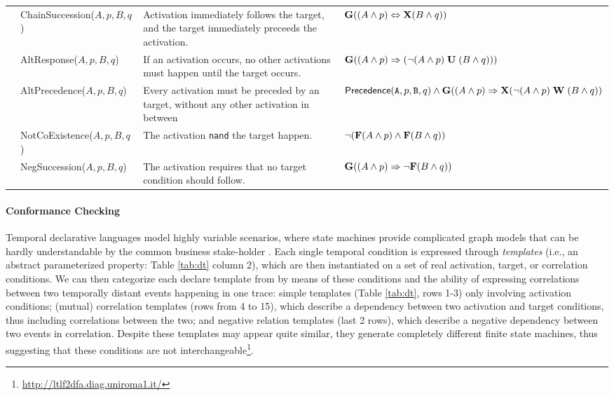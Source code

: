 \begin{table}
{\begin{tabular}{c|l|p{9cm}|l}
	 & \textsf{ChainSuccession($A,p,B,q$) }  & Activation immediately follows the target, and the target immediately preceeds the activation. & $\mathbf{G}((A\wedge p)\Leftrightarrow\mathbf{X}(B\wedge q))$\\
	 & \textsf{AltResponse($A,p,B,q$) }  & If an activation occurs, no other activations must happen until the target occurs.  & $\mathbf{G}((A\wedge p)\Rightarrow({\neg(A\wedge p)}\;\mathbf{U}\;{(B\wedge q)}))$\\
	 & \textsf{AltPrecedence($A,p,B,q$) }  & Every activation must be preceded by an target, without any other
	 activation in between &   $\textsf{Precedence}(\texttt{A},p,\texttt{B},q)\wedge \mathbf{G}((A\wedge p)\Rightarrow \mathbf{X}({\neg(A\wedge p)}\;\mathbf{W}\;{(B\wedge q)})$\\
	 \midrule
	 
	 \parbox[t]{2mm}{} & \textsf{NotCoExistence($A,p,B,q$) } & The activation \texttt{nand} the target happen.&  $\neg(\mathbf{F}(A\wedge p)\wedge\mathbf{F}(B\wedge q))$\\
	 & \textsf{NegSuccession($A,p,B,q$)} & The activation requires that no target condition should follow.& $\mathbf{G}((A\wedge p)\Rightarrow \neg\mathbf{F}(B\wedge q))$ \\
	 \bottomrule
\end{tabular}}
\end{table}



\paragraph*{Conformance Checking}\label{sec:DAD} Temporal declarative languages model highly variable scenarios, where state machines provide complicated graph models that can be hardly understandable by the common business stake-holder \cite{PichlerWZPMR11}. Each single temporal condition is expressed through \textit{templates} (i.e., an abstract parameterized property: Table \ref{tab:dt} column 2), which are then instantiated on a set of real activation, target, or correlation conditions. We can then categorize each declare template from \cite{Li2020} by means of these conditions and the ability of expressing correlations between two temporally distant events happening in one %
trace:%
simple
 templates (Table \ref{tab:dt}, rows 1-3) only involving activation conditions; (mutual)
 correlation templates (rows from 4 to 15), which describe a dependency between two
activation and target conditions, thus including correlations between the two; and negative relation templates (last 2 rows), which describe a negative
dependency between two events in correlation. %
Despite %
these templates may appear quite similar, they generate completely different finite state machines, thus suggesting that these conditions are not interchangeable\footnote{\url{http://ltlf2dfa.diag.uniroma1.it/}}. 


